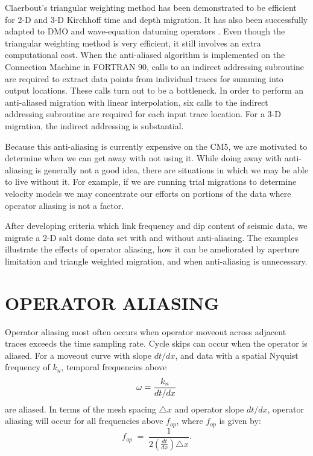 Claerbout's triangular weighting method has been demonstrated to be
efficient for 2-D \cite[]{Bevc.sep.75.91,Bevc.sep.77.295} and 
3-D \cite[]{Lumley.sep.77.1,Lumley.sep.80.447} 
Kirchhoff time and depth migration.  
It has also been successfully adapted to DMO and 
wave-equation datuming operators \cite[]{Blondel.sep.77.49,Bevc.sep.75.137}.
Even though the triangular weighting method is very efficient, it 
still involves an extra computational cost.
When the anti-aliased algorithm is implemented on the
Connection Machine in FORTRAN 90,
calls to an indirect addressing subroutine are required to extract
data points from individual traces for summing into output locations.
These calls turn out to be a bottleneck.
In order to perform an anti-aliased migration with linear interpolation,
six calls to the indirect addressing subroutine are required for each
input trace location. For a 3-D migration, the indirect addressing
is substantial.

Because this anti-aliasing is currently expensive on the CM5,
we are motivated to
determine when we can get away with not using it. While doing away 
with anti-aliasing is generally not a good idea, there are situations in which
we may be able to live without it. For example, if we are running 
trial migrations to determine velocity models we may concentrate
our efforts on portions of the data where operator aliasing is not a
factor. 

After developing criteria which link frequency and dip content of seismic data,
we migrate a 2-D  salt dome data set with and without anti-aliasing.
The examples illustrate the effects of operator aliasing, how it can be 
ameliorated by aperture limitation and triangle weighted migration, and
when anti-aliasing is unnecessary.

\section{OPERATOR ALIASING}
Operator aliasing most often occurs when operator moveout across adjacent
traces exceeds the time sampling rate. Cycle skips can occur 
when the operator is
aliased.  For a moveout curve with slope $dt/dx$, and data with a spatial
Nyquist frequency of $k_n$, temporal frequencies above
$$
\omega = {k_n\over{dt/dx}}
$$
are aliased.
In terms of the mesh spacing $\triangle x$ and operator slope $dt/dx$,
operator aliasing will occur for all frequencies above $f_{op}$, where
$f_{op}$ is given by:
\begin{equation}
f_{op} \; = \; \frac{1}{2 (\frac{dt}{dx}) \triangle x}.
\end{equation}

